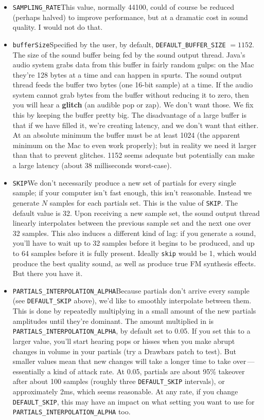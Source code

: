 \documentclass{article}
\begin{document}
\begin{itemize}
\item {\tt SAMPLING\_RATE}\qquad This value, normally 44100, could of course be reduced (perhaps halved) to improve performance, but at a dramatic cost in sound quality.  I would not do that.

\item {\tt bufferSize}\qquad Specified by the user, by default, {\tt DEFAULT\_BUFFER\_SIZE} \(=1152\). The size of the sound buffer being fed by the sound output thread.  Java's audio system grabs data from this buffer in fairly random gulps: on the Mac they're 128 bytes at a time and can happen in spurts.  The sound output thread feeds the buffer two bytes (one 16-bit sample) at a time.  If the audio system cannot grab bytes from the buffer without reducing it to zero, then you will hear a {\bf glitch} (an audible pop or zap).  We don't want those.  We fix this by keeping the buffer pretty big.  The disadvantage of a large buffer is that if we have filled it, we're creating latency, and we don't want that either.  At an absolute minimum the buffer must be at least 1024 (the apparent minimum on the Mac to even work properly); but in reality we need it larger than that to prevent glitches.  1152 seems adequate but potentially can make a large latency (about 38 milliseconds worst-case).

\item {\tt SKIP}\qquad We don't necessarily produce a new set of partials for every single sample; if your computer isn't fast enough, this isn't reasonable.  Instead we generate \(N\) samples for each partials set.  This is the value of {\tt SKIP}.  The default value is 32.  Upon receiving a new sample set, the sound output thread linearly interpolates between the previous sample set and the next one over 32 samples.  This also induces a different kind of lag: if you generate a sound, you'll have to wait up to 32 samples before it begins to be produced, and up to 64 samples before it is fully present.  Ideally {\tt skip} would be 1, which would produce the best quality sound, as well as produce true FM synthesis effects.  But there you have it.

\item {\tt PARTIALS\_INTERPOLATION\_ALPHA}\qquad Because partials don't arrive every sample (see {\tt DEFAULT\_SKIP} above), we'd like to smoothly interpolate between them.  This is done by repeatedly multiplying in a small amount of the new partials amplitudes until they're dominant.  The amount multiplied in is {\tt PARTIALS\_INTERPOLATION\_ALPHA}, by default set to 0.05.  If you set this to a larger value, you'll start hearing pops or hisses when you make abrupt changes in volume in your partials (try a Drawbars patch to test).  But smaller values mean that new changes will take a longer time to take over\,---\,essentially a kind of attack rate.  At 0.05, partials are about 95\% takeover after about 100 samples (roughly three {\tt DEFAULT\_SKIP} intervals), or approximately 2ms, which seems reasonable.  At any rate, if you change {\tt DEFAULT\_SKIP}, this may have an impact on what setting you want to use for {\tt PARTIALS\_INTERPOLATION\_ALPHA} too.


\end{itemize}
\end{document}
